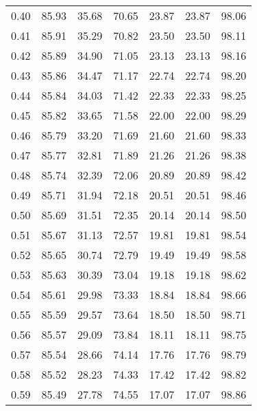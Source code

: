\begin{tabular}{|c|c|c|c|c|c|c|}
      0.40 &     85.93 &     35.68 &      70.65 &   23.87 &      23.87 &         98.06 \\
      0.41 &     85.91 &     35.29 &      70.82 &   23.50 &      23.50 &         98.11 \\
      0.42 &     85.89 &     34.90 &      71.05 &   23.13 &      23.13 &         98.16 \\
      0.43 &     85.86 &     34.47 &      71.17 &   22.74 &      22.74 &         98.20 \\
      0.44 &     85.84 &     34.03 &      71.42 &   22.33 &      22.33 &         98.25 \\
      0.45 &     85.82 &     33.65 &      71.58 &   22.00 &      22.00 &         98.29 \\
      0.46 &     85.79 &     33.20 &      71.69 &   21.60 &      21.60 &         98.33 \\
      0.47 &     85.77 &     32.81 &      71.89 &   21.26 &      21.26 &         98.38 \\
      0.48 &     85.74 &     32.39 &      72.06 &   20.89 &      20.89 &         98.42 \\
      0.49 &     85.71 &     31.94 &      72.18 &   20.51 &      20.51 &         98.46 \\
      0.50 &     85.69 &     31.51 &      72.35 &   20.14 &      20.14 &         98.50 \\
      0.51 &     85.67 &     31.13 &      72.57 &   19.81 &      19.81 &         98.54 \\
      0.52 &     85.65 &     30.74 &      72.79 &   19.49 &      19.49 &         98.58 \\
      0.53 &     85.63 &     30.39 &      73.04 &   19.18 &      19.18 &         98.62 \\
      0.54 &     85.61 &     29.98 &      73.33 &   18.84 &      18.84 &         98.66 \\
      0.55 &     85.59 &     29.57 &      73.64 &   18.50 &      18.50 &         98.71 \\
      0.56 &     85.57 &     29.09 &      73.84 &   18.11 &      18.11 &         98.75 \\
      0.57 &     85.54 &     28.66 &      74.14 &   17.76 &      17.76 &         98.79 \\
      0.58 &     85.52 &     28.23 &      74.33 &   17.42 &      17.42 &         98.82 \\
      0.59 &     85.49 &     27.78 &      74.55 &   17.07 &      17.07 &         98.86 \\

\end{tabular}
